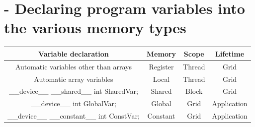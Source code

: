\section{- Declaring program variables into the various memory types}
\begin{center}
      \begin{tabular}{c|c|c|c}
            Variable declaration                          & Memory   & Scope  & Lifetime    \\
            \hline
            Automatic variables other than arrays         & Register & Thread & Grid        \\
            Automatic array variables                     & Local    & Thread & Grid        \\
            \_\_device\_\_ \_\_shared\_\_ int SharedVar;  & Shared   & Block  & Grid        \\
            \_\_device\_\_ int GlobalVar;                 & Global   & Grid   & Application \\
            \_\_device\_\_ \_\_constant\_\_ int ConstVar; & Constant & Grid   & Application \\
      \end{tabular}
\end{center}
